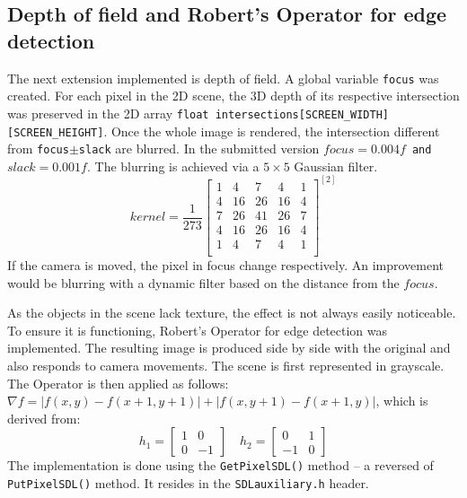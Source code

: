 \documentclass[DIV=calc, paper=a4, fontsize=11pt, twocolumn]{article}	 %
\begin{document}
	\subsection*{Depth of field and Robert's Operator for edge detection}
	The next extension implemented is depth of field. A global variable \texttt{focus} was created. For each pixel in the 2D scene, the 3D depth of its respective intersection was preserved in the 2D array \texttt{float intersections[SCREEN\_WIDTH][SCREEN\_HEIGHT]}. Once the whole image is rendered, the intersection different from \texttt{focus$\pm$slack} are blurred. In the submitted version \texttt{$focus = 0.004f$ and $slack = 0.001f$}. The blurring is achieved via a $5\times 5$ Gaussian filter.
	\[
		kernel = \dfrac{1}{273}
		\begin{bmatrix} 
		1 &  4 &  7 &  4 & 1 \\
		4 & 16 & 26 & 16 & 4 \\
		7 & 26 & 41 & 26 & 7 \\
		4 & 16 & 26 & 16 & 4 \\
		1 &  4 &  7 &  4 & 1 \\
		\end{bmatrix}^{[2]}
	\]
	If the camera is moved, the pixel in focus change respectively. An improvement would be blurring with a dynamic filter based on the distance from the \texttt{$focus$}.
	\par
	As the objects in the scene lack texture, the effect is not always easily noticeable. To ensure it is functioning, Robert's Operator for edge detection was implemented. The resulting image is produced side by side with the original and also responds to camera movements. The scene is first represented in grayscale. The Operator is then applied as follows: $\nabla f = |f(x,y) - f(x+1,y+1)| + |f(x,y+1) - f(x+1,y)| $, which is derived from:
	\[
		h_{1} = 
		\begin{bmatrix} 
		1 & 0 \\
		0 & -1 
		\end{bmatrix}
		\quad
		h_{2} = 
		\begin{bmatrix} 
		0 & 1 \\
		-1 & 0 
		\end{bmatrix}
	\]
	The implementation is done using the \texttt{GetPixelSDL()} method -- a reversed of \texttt{PutPixelSDL()} method. It resides in the \texttt{SDLauxiliary.h} header.
	
	
\end{document}
